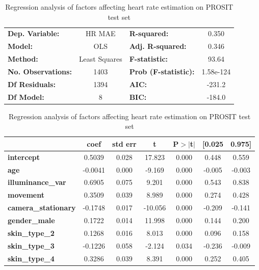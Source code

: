 \documentclass{article}
\begin{document}
\begin{table}[h!]
\begin{center}
\caption{Regression analysis of factors affecting heart rate estimation on PROSIT test set}
\label{tab:vv-hr-regression-prosit}
\begin{tabular}{lclc}
\toprule
\textbf{Dep. Variable:}          &  HR MAE          & \textbf{  R-squared:         } &     0.350   \\
\textbf{Model:}                  &       OLS        & \textbf{  Adj. R-squared:    } &     0.346   \\
\textbf{Method:}                 &  Least Squares   & \textbf{  F-statistic:       } &     93.64   \\
\textbf{No. Observations:}       &        1403      & \textbf{  Prob (F-statistic):} & 1.58e-124   \\
\textbf{Df Residuals:}           &        1394      & \textbf{  AIC:               } &    -231.2   \\
\textbf{Df Model:}               &           8      & \textbf{  BIC:               } &    -184.0   \\
\bottomrule
\end{tabular}
\begin{tabular}{lcccccc}
                                 & \textbf{coef} & \textbf{std err} & \textbf{t} & \textbf{P$> |$t$|$} & \textbf{[0.025} & \textbf{0.975]}  \\
\midrule
\textbf{intercept}               &       0.5039  &        0.028     &    17.823  &         0.000        &        0.448    &        0.559     \\
\textbf{age}                     &      -0.0041  &        0.000     &    -9.169  &         0.000        &       -0.005    &       -0.003     \\
\textbf{illuminance\_var}        &       0.6905  &        0.075     &     9.201  &         0.000        &        0.543    &        0.838     \\
\textbf{movement}                &       0.3509  &        0.039     &     8.989  &         0.000        &        0.274    &        0.428     \\
\textbf{camera\_stationary}      &      -0.1748  &        0.017     &   -10.056  &         0.000        &       -0.209    &       -0.141     \\
\textbf{gender\_male}            &       0.1722  &        0.014     &    11.998  &         0.000        &        0.144    &        0.200     \\
\textbf{skin\_type\_2}           &       0.1268  &        0.016     &     8.013  &         0.000        &        0.096    &        0.158     \\
\textbf{skin\_type\_3}           &      -0.1226  &        0.058     &    -2.124  &         0.034        &       -0.236    &       -0.009     \\
\textbf{skin\_type\_4}           &       0.3286  &        0.039     &     8.391  &         0.000        &        0.252    &        0.405     \\
\bottomrule
\end{tabular}
\end{center}
\end{table}
\end{document}
